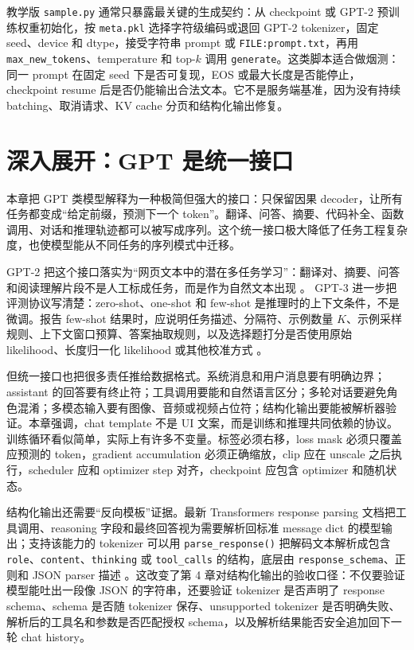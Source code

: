 \documentclass[UTF8,zihao=-4,openany]{ctexbook}
\begin{document}
教学版 \texttt{sample.py} 通常只暴露最关键的生成契约：从 checkpoint 或 GPT-2 预训练权重初始化，按 \texttt{meta.pkl} 选择字符级编码或退回 GPT-2 tokenizer，固定 seed、device 和 dtype，接受字符串 prompt 或 \texttt{FILE:prompt.txt}，再用 \texttt{max\_new\_tokens}、temperature 和 top-$k$ 调用 \texttt{generate}。这类脚本适合做烟测：同一 prompt 在固定 seed 下是否可复现，EOS 或最大长度是否能停止，checkpoint resume 后是否仍能输出合法文本。它不是服务端基准，因为没有持续 batching、取消请求、KV cache 分页和结构化输出修复。

\section{深入展开：GPT 是统一接口}
本章把 GPT 类模型解释为一种极简但强大的接口：只保留因果 decoder，让所有任务都变成“给定前缀，预测下一个 token”。翻译、问答、摘要、代码补全、函数调用、对话和推理轨迹都可以被写成序列。这个统一接口极大降低了任务工程复杂度，也使模型能从不同任务的序列模式中迁移。

GPT-2 把这个接口落实为“网页文本中的潜在多任务学习”：翻译对、摘要、问答和阅读理解片段不是人工标成任务，而是作为自然文本出现 \cite{radford2019language}。 GPT-3 进一步把评测协议写清楚：zero-shot、one-shot 和 few-shot 是推理时的上下文条件，不是微调。报告 few-shot 结果时，应说明任务描述、分隔符、示例数量 $K$、示例采样规则、上下文窗口预算、答案抽取规则，以及选择题打分是否使用原始 likelihood、长度归一化 likelihood 或其他校准方式 \cite{brown2020language}。

但统一接口也把很多责任推给数据格式。系统消息和用户消息要有明确边界；assistant 的回答要有终止符；工具调用要能和自然语言区分；多轮对话要避免角色混淆；多模态输入要有图像、音频或视频占位符；结构化输出要能被解析器验证。本章强调，chat template 不是 UI 文案，而是训练和推理共同依赖的协议。训练循环看似简单，实际上有许多不变量。标签必须右移，loss mask 必须只覆盖应预测的 token，gradient accumulation 必须正确缩放，clip 应在 unscale 之后执行，scheduler 应和 optimizer step 对齐，checkpoint 应包含 optimizer 和随机状态。

结构化输出还需要“反向模板”证据。最新 Transformers response parsing 文档把工具调用、reasoning 字段和最终回答视为需要解析回标准 message dict 的模型输出；支持该能力的 tokenizer 可以用 \texttt{parse\_response()} 把解码文本解析成包含 \texttt{role}、\texttt{content}、\texttt{thinking} 或 \texttt{tool\_calls} 的结构，底层由 \texttt{response\_schema}、正则和 JSON parser 描述 \cite{huggingface2026transformersresponseparsing}。这改变了第 4 章对结构化输出的验收口径：不仅要验证模型能吐出一段像 JSON 的字符串，还要验证 tokenizer 是否声明了 response schema、schema 是否随 tokenizer 保存、unsupported tokenizer 是否明确失败、解析后的工具名和参数是否匹配授权 schema，以及解析结果能否安全追加回下一轮 chat history。
\end{document}
